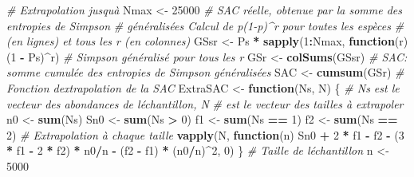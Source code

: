 \documentclass[
  11pt,
  french,
  a4paper,
  extrafontsizes,onecolumn,openright
  ]{memoir}
\newenvironment{Shaded}{\begin{snugshade}}{\end{snugshade}}
\newcommand{\CommentTok}[1]{\textcolor[rgb]{0.56,0.35,0.01}{\textit{#1}}}
\newcommand{\ControlFlowTok}[1]{\textcolor[rgb]{0.13,0.29,0.53}{\textbf{#1}}}
\newcommand{\DecValTok}[1]{\textcolor[rgb]{0.00,0.00,0.81}{#1}}
\newcommand{\FunctionTok}[1]{\textcolor[rgb]{0.13,0.29,0.53}{\textbf{#1}}}
\newcommand{\NormalTok}[1]{#1}
\newcommand{\OtherTok}[1]{\textcolor[rgb]{0.56,0.35,0.01}{#1}}
\newcommand{\SpecialCharTok}[1]{\textcolor[rgb]{0.81,0.36,0.00}{\textbf{#1}}}
\begin{document}
\begin{Shaded}
\begin{Highlighting}[]
\CommentTok{\# Extrapolation jusqu\textquotesingle{}à}
\NormalTok{Nmax }\OtherTok{\textless{}{-}} \DecValTok{25000}
\CommentTok{\# SAC réelle, obtenue par la somme des entropies de Simpson}
\CommentTok{\# généralisées Calcul de p(1{-}p)\^{}r pour toutes les espèces}
\CommentTok{\# (en lignes) et tous les r (en colonnes)}
\NormalTok{GSsr }\OtherTok{\textless{}{-}}\NormalTok{ Ps }\SpecialCharTok{*} \FunctionTok{sapply}\NormalTok{(}\DecValTok{1}\SpecialCharTok{:}\NormalTok{Nmax, }\ControlFlowTok{function}\NormalTok{(r) (}\DecValTok{1} \SpecialCharTok{{-}}\NormalTok{ Ps)}\SpecialCharTok{\^{}}\NormalTok{r)}
\CommentTok{\# Simpson généralisé pour tous les r}
\NormalTok{GSr }\OtherTok{\textless{}{-}} \FunctionTok{colSums}\NormalTok{(GSsr)}
\CommentTok{\# SAC: somme cumulée des entropies de Simpson généralisées}
\NormalTok{SAC }\OtherTok{\textless{}{-}} \FunctionTok{cumsum}\NormalTok{(GSr)}
\CommentTok{\# Fonction d\textquotesingle{}extrapolation de la SAC}
\NormalTok{ExtraSAC }\OtherTok{\textless{}{-}} \ControlFlowTok{function}\NormalTok{(Ns, N) \{}
    \CommentTok{\# Ns est le vecteur des abondances de l\textquotesingle{}échantillon, N}
    \CommentTok{\# est le vecteur des tailles à extrapoler}
\NormalTok{    n0 }\OtherTok{\textless{}{-}} \FunctionTok{sum}\NormalTok{(Ns)}
\NormalTok{    Sn0 }\OtherTok{\textless{}{-}} \FunctionTok{sum}\NormalTok{(Ns }\SpecialCharTok{\textgreater{}} \DecValTok{0}\NormalTok{)}
\NormalTok{    f1 }\OtherTok{\textless{}{-}} \FunctionTok{sum}\NormalTok{(Ns }\SpecialCharTok{==} \DecValTok{1}\NormalTok{)}
\NormalTok{    f2 }\OtherTok{\textless{}{-}} \FunctionTok{sum}\NormalTok{(Ns }\SpecialCharTok{==} \DecValTok{2}\NormalTok{)}
    \CommentTok{\# Extrapolation à chaque taille}
    \FunctionTok{vapply}\NormalTok{(N, }\ControlFlowTok{function}\NormalTok{(n) Sn0 }\SpecialCharTok{+} \DecValTok{2} \SpecialCharTok{*}\NormalTok{ f1 }\SpecialCharTok{{-}}\NormalTok{ f2 }\SpecialCharTok{{-}}\NormalTok{ (}\DecValTok{3} \SpecialCharTok{*}\NormalTok{ f1 }\SpecialCharTok{{-}} \DecValTok{2} \SpecialCharTok{*}\NormalTok{ f2) }\SpecialCharTok{*}
\NormalTok{        n0}\SpecialCharTok{/}\NormalTok{n }\SpecialCharTok{{-}}\NormalTok{ (f2 }\SpecialCharTok{{-}}\NormalTok{ f1) }\SpecialCharTok{*}\NormalTok{ (n0}\SpecialCharTok{/}\NormalTok{n)}\SpecialCharTok{\^{}}\DecValTok{2}\NormalTok{, }\DecValTok{0}\NormalTok{)}
\NormalTok{\}}
\CommentTok{\# Taille de l\textquotesingle{}échantillon}
\NormalTok{n }\OtherTok{\textless{}{-}} \DecValTok{5000}

\end{Highlighting}
\end{Shaded}
\end{document}
